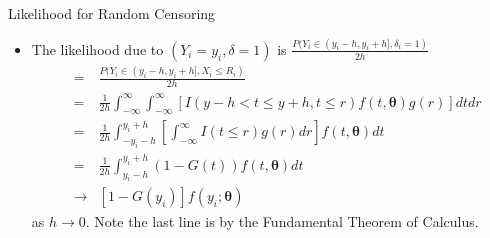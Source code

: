 \documentclass{beamer}
\begin{document}
    
        \begin{frame}{Likelihood for Random Censoring}
        \begin{itemize}
            \item The likelihood due to $(Y_{i} = y_{i}, \delta = 1)$ is $\frac{P(Y_{i} \in (y_{i} - h, y_{i} + h], \delta_{i} = 1)}{2h}$
            \begin{eqnarray}
             & = &      \frac{P(Y_{i} \in (y_{i} - h, y_{i} + h], X_{i} \leq R_{i})}{2h} \nonumber \\
            & = &     \frac{1}{2h} \int^{\infty}_{-\infty}\int^{\infty}_{-\infty}\left[I(y-h < t \leq y + h, t \leq r)f(t,\boldsymbol{\theta})g(r)\right]dtdr \nonumber\\
         & = &     \frac{1}{2h} \int^{y_{i}+h}_{-y_{i}-h}\left[\int^{\infty}_{-\infty}I( t \leq r)g(r)dr\right]f(t,\boldsymbol{\theta})dt \nonumber\\
         & = &     \frac{1}{2h} \int^{y_{i}+h}_{y_{i}-h}\left(1-G(t)\right)f(t,\boldsymbol{\theta})dt \nonumber\\
         & \rightarrow &
         [1-G(y_{i})]f(y_{i};\boldsymbol{\theta}) \nonumber
            \end{eqnarray}
as $h \rightarrow 0$. Note the last line is by the Fundamental Theorem of Calculus.
        \end{itemize}
    \end{frame}
    
\end{document}

